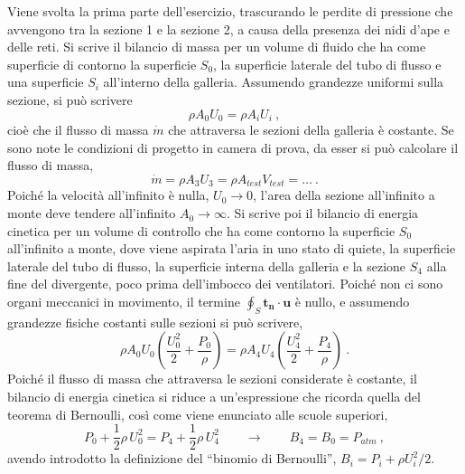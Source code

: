 \parttwo
Viene svolta la prima parte dell'esercizio, trascurando le perdite di pressione che avvengono tra la sezione 1 e la sezione 2, a causa della presenza dei nidi d'ape e delle reti.
\newline \noindent
Si scrive il bilancio di massa per un volume di fluido che ha come superficie di contorno la superficie $S_0$, la superficie laterale del tubo di flusso e una superficie $S_i$ all'interno della galleria. Assumendo grandezze uniformi sulla sezione, si può scrivere
\begin{equation}
 \rho A_0 U_0 = \rho A_i U_i \ ,
\end{equation}
cioè che il flusso di massa $\dot{m}$ che attraversa le sezioni della galleria è costante. Se sono note le condizioni di progetto in camera di prova, da esser si può calcolare il flusso di massa,
\begin{equation}
 \dot{m} = \rho A_3 U_3 = \rho A_{test} V_{test} = \dots \ .
\end{equation}
Poiché la velocità all'infinito è nulla, $U_0 \rightarrow 0$, l'area della sezione all'infinito a monte deve tendere all'infinito $A_0 \rightarrow \infty$.
\newline \noindent
Si scrive poi il bilancio di energia cinetica per un volume di controllo che ha come contorno la superficie $S_0$ all'infinito a monte, dove viene aspirata l'aria in uno stato di quiete, la superficie laterale del tubo di flusso, la superficie interna della galleria e la sezione $S_4$ alla fine del divergente, poco prima dell'imbocco dei ventilatori. Poiché non ci sono organi meccanici in movimento, il termine $\oint_S \bm{t_n} \cdot \bm{u}$ è nullo, e assumendo grandezze fisiche costanti sulle sezioni si può scrivere,
\begin{equation}
 \rho A_0 U_0 \left( \dfrac{U_0^2}{2} + \dfrac{P_0}{\rho} \right) =
 \rho A_4 U_4 \left( \dfrac{U_4^2}{2} + \dfrac{P_4}{\rho} \right) \ .
\end{equation}
Poiché il flusso di massa che attraversa le sezioni considerate è costante, il bilancio di energia cinetica si riduce a un'espressione che ricorda quella del teorema di Bernoulli, così come viene enunciato alle scuole superiori,
\begin{equation}
 P_0 + \dfrac{1}{2} \rho \, U_0^2  = P_4 + \dfrac{1}{2} \rho \, U_4^2
 \qquad \rightarrow \qquad B_4 = B_0 = P_{atm} \ ,
\end{equation}
avendo introdotto la definizione del ``binomio di Bernoulli'', $B_i = P_i + \rho U_i^2 / 2$.
\newline \noindent
